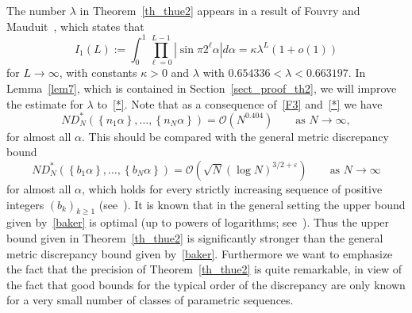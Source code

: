 \documentclass[12pt]{amsart}
\newcommand {\ve} {\varepsilon}
\begin{document}
The number $\lambda$ in Theorem~\ref{th_thue2} appears in a result of Fouvry and Mauduit~\cite{foumau}, which states that
\begin{equation} \label{FO4}
I_1(L) := \int^{1}_{0} \prod^{L-1}_{\ell=0} \left|\sin \pi 2^{\ell} \alpha \right|d \alpha = \kappa \lambda^{L} \left(1+o(1)\right)
\end{equation}
for $L\rightarrow\infty$, with constants $\kappa > 0$ and $\lambda$ with $0.654336 < \lambda <0.663197.$ In Lemma~\ref{lem7}, which is contained in Section~\ref{sect_proof_th2}, we will improve the estimate for $\lambda$ to~\eqref{*}. Note that as a consequence of~\eqref{F3} and~\eqref{*} we have
$$
N D^{*}_{N} \left(\left\{n_{1} \alpha\right\}, \ldots, \left\{n_{N} \alpha\right\}\right) = \mathcal{O} \left( N^{0.404} \right) \qquad \textrm{as $N \to \infty$}, 
$$
for almost all $\alpha$. This should be compared with the general metric discrepancy bound
\begin{equation} \label{baker}
N D^{*}_{N} \left(\left\{b_{1} \alpha\right\}, \ldots, \left\{b_{N} \alpha\right\}\right) = \mathcal{O} \left( \sqrt{N} (\log N)^{3/2 + \ve} \right) \qquad \textrm{as $N \to \infty$}
\end{equation}
for almost all $\alpha$, which holds for every strictly increasing sequence of positive integers $(b_k)_{k \geq 1}$ (see~\cite{baker}). It is known that in the general setting the upper bound given by~\eqref{baker} is optimal (up to powers of logarithms; see~\cite{bpt}). Thus the upper bound given in Theorem~\ref{th_thue2} is significantly stronger than the general metric discrepancy bound given by~\eqref{baker}. Furthermore we want to emphasize the fact that the precision of Theorem~\ref{th_thue2} is quite remarkable, in view of the fact that good bounds for the typical order of the discrepancy are only known for a very small number of classes of parametric sequences.\\
\end{document}
